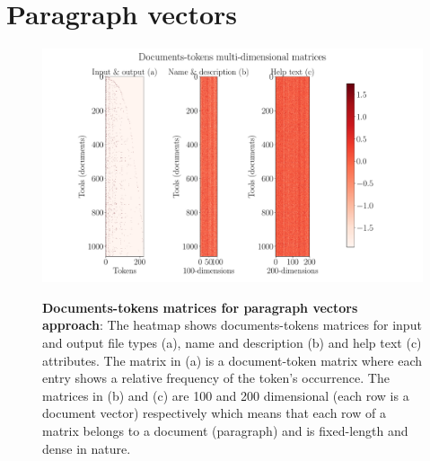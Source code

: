 \section{Paragraph vectors}

\begin{figure}[h]
\begin{centering}
    {\includegraphics[scale=0.4]{figures/Documents-tokens_doc2vec.pdf}}
    \caption[Documents-tokens matrices for paragraph vectors approach]{\textbf{Documents-tokens matrices for paragraph vectors approach}: The heatmap shows documents-tokens matrices for input and output file types (a), name and description (b) and help text (c) attributes. The matrix in (a) is a document-token matrix where each entry shows a relative frequency of the token's occurrence. The matrices in (b) and (c) are 100 and 200 dimensional (each row is a document vector) respectively which means that each row of a matrix belongs to a document (paragraph) and is fixed-length and dense in nature. }
\end{centering}
\end{figure}

